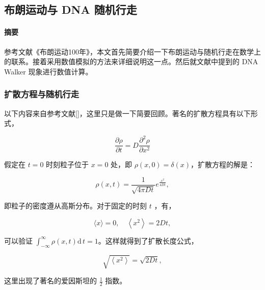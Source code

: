 \documentclass[
]{article}
\date{}
\begin{document}
\hypertarget{header-n0}{%
\subsection{布朗运动与 DNA 随机行走}\label{header-n0}}

\hypertarget{header-n2}{%
\paragraph{摘要}\label{header-n2}}

参考文献《布朗运动100年》，本文首先简要介绍一下布朗运动与随机行走在数学上的联系。接着采用数值模拟的方法来详细说明这一点。然后就文献中提到的
DNA Walker 现象进行数值计算。

\hypertarget{header-n4}{%
\subsubsection{扩散方程与随机行走}\label{header-n4}}

以下内容来自参考文献{[}{]}，这里只是做一下简要回顾。著名的扩散方程具有以下形式，

\[\frac{\partial \rho}{\partial t}=D \frac{\partial^{2} \rho}{\partial x^{2}}\]

假定在 \(t =0\) 时刻粒子位于 \(x =0\) 处，即
\(\rho(x , 0) = \delta ( x )\)，扩散方程的解是：

\[\rho(x, t)=\frac{1}{\sqrt{4 \pi D t}} e^{\frac{x^{2}}{4 D t}},\]

即粒子的密度遵从高斯分布。对于固定的时刻 \(t\) ，有，

\[\langle x\rangle= 0, \quad\left\langle x^{2}\right\rangle= 2 D t,\]

可以验证
\(\displaystyle{\int_{-\infty}^{\infty}\rho(x,t) \mathrm{d}\,t=1}\)。这样就得到了扩散长度公式，

\[\sqrt{\left\langle x^{2}\right\rangle}=\sqrt{2 D t},\]

这里出现了著名的爱因斯坦的 \(\frac{1} {2} \) 指数。
\end{document}
